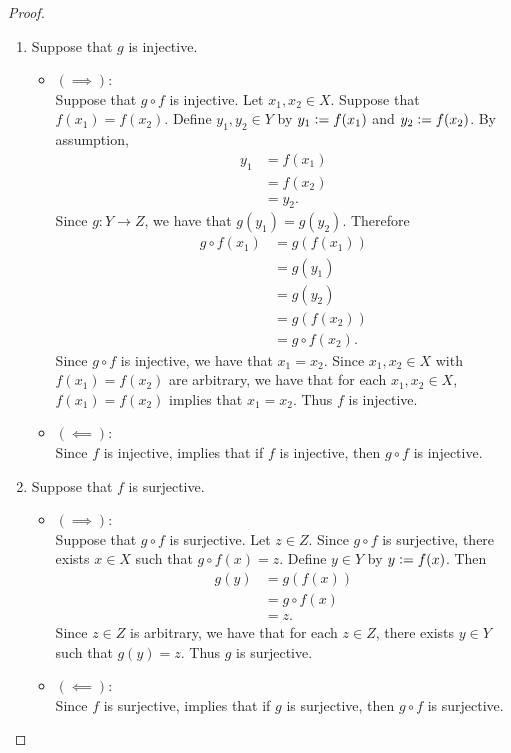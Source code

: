 \documentclass{book}
\begin{document}
	\begin{proof}\
		\begin{enumerate}
			\item Suppose that $g$ is injective. 
			\begin{itemize}
				\item $(\implies)$: \\
				Suppose that $g \circ f$ is injective. Let $x_1, x_2 \in X$. Suppose that $f(x_1) = f(x_2)$. Define $y_1, y_2 \in Y$ by $y_1 \vcentcolon= f(x_1)$ and $y_2 \vcentcolon= f(x_2)$. By assumption,  
				\begin{align*}
					y_1
					& = f(x_1) \\
					& = f(x_2) \\
					& = y_2.
				\end{align*}
				Since $g:Y \rightarrow Z$, we have that $g(y_1) = g(y_2)$. Therefore
				\begin{align*}
					g \circ f(x_1) 
					& = g(f(x_1)) \\
					& = g(y_1) \\
					& = g(y_2) \\
					& = g(f(x_2)) \\
					& = g \circ f(x_2).
				\end{align*}
				Since $g \circ f$ is injective, we have that $x_1 = x_2$. Since $x_1, x_2 \in X$ with $f(x_1) = f(x_2)$ are arbitrary, we have that for each $x_1, x_2 \in X$, $f(x_1) = f(x_2)$ implies that $x_1 = x_2$. Thus $f$ is injective.
				\item $(\impliedby)$: \\
				Since $f$ is injective, \rex{}  implies that if $f$ is injective, then $g \circ f$ is injective. 
			\end{itemize}
			\item Suppose that $f$ is surjective. 
			\begin{itemize}
				\item $(\implies)$: \\
				Suppose that $g \circ f$ is surjective. Let $z \in Z$. Since $g \circ f$ is surjective, there exists $x \in X$ such that $g \circ f(x) = z$. Define $y \in Y$ by $y \vcentcolon= f(x)$. Then 
				\begin{align*}
					g(y)
					& = g(f(x)) \\
					& = g \circ f(x) \\
					& = z. 
				\end{align*}
				Since $z \in Z$ is arbitrary, we have that for each $z \in Z$, there exists $y \in Y$ such that $g(y) = z$. Thus $g$ is surjective. 
				\item $(\impliedby)$: \\
				Since $f$ is surjective, \rex{}  implies that if $g$ is surjective, then $g \circ f$ is surjective. 
			\end{itemize}
		\end{enumerate}
	\end{proof}
	
\end{document}

